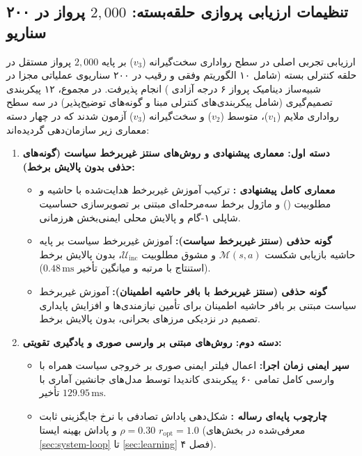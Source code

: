 \documentclass[oneside,openany,phd]{TMU-Thesis}
\begin{document}
\subsection{تنظیمات ارزیابی پروازی حلقه‌بسته: \texorpdfstring{$2{,}000$}{2,000} پرواز در ۲۰۰ سناریو}
\label{subsec:dartsim_setup}

ارزیابی تجربی اصلی در سطح رواداری سخت‌گیرانه ($v_3$) بر پایه $2{,}000$ پرواز مستقل در حلقه کنترلی بسته (شامل ۱۰ الگوریتم وفقی و رقیب در ۲۰۰ سناریوی عملیاتی مجزا در شبیه‌ساز دینامیک پرواز ۶ درجه آزادی ) انجام پذیرفت. در مجموع، ۱۲ پیکربندی تصمیم‌گیری (شامل پیکربندی‌های کنترلی مبنا و گونه‌های توضیح‌پذیر) در سه سطح رواداری ملایم ($v_1$)، متوسط ($v_2$) و سخت‌گیرانه ($v_3$) آزمون شدند که در چهار دسته معماری زیر سازمان‌دهی گردیده‌اند:
\begin{enumerate}
    \item \textbf{دسته اول: معماری پیشنهادی و روش‌های سنتز غیربرخط سیاست (گونه‌های حذفی بدون پالایش برخط):}
    \begin{itemize}
        \item \textbf{معماری کامل پیشنهادی \rsdrlplus:} ترکیب آموزش غیربرخط هدایت‌شده با حاشیه و مطلوبیت (\mursdrl) و ماژول برخط سه‌مرحله‌ای \pgalr مبتنی بر تصویرسازی حساسیت شاپلی ۱-گام و پالایش محلی ایمنی‌بخش هرزمانی.
        \item \textbf{گونه حذفی \mursdrl (سنتز غیربرخط سیاست):} آموزش غیربرخط سیاست بر پایه حاشیه بازیابی شکست $\mathcal{M}(s, a)$ و مشوق مطلوبیت $\mathcal{U}_{\text{inc}}$، بدون پالایش برخط (استنتاج با مرتبه  و میانگین تأخیر $0.48\,\text{ms}$).
        \item \textbf{گونه حذفی \cmrsdrl (سنتز غیربرخط با بافر حاشیه اطمینان):} آموزش غیربرخط سیاست مبتنی بر بافر حاشیه اطمینان برای تأمین نیازمندی‌ها و افزایش پایداری تصمیم در نزدیکی مرزهای بحرانی، بدون پالایش برخط.
    \end{itemize}
    \item \textbf{دسته دوم: روش‌های مبتنی بر وارسی صوری و یادگیری تقویتی:}
    \begin{itemize}
        \item \textbf{سپر ایمنی زمان اجرا:} اعمال فیلتر ایمنی صوری بر خروجی سیاست همراه با وارسی کامل تمامی ۶۰ پیکربندی کاندیدا توسط مدل‌های جانشین آماری \cite{alshiekh2018safe} با تأخیر $129.95\,\text{ms}$.
        \item \textbf{چارچوب پایه‌ای رساله \cite{kavianifar2026rsdrl}:} شکل‌دهی پاداش تصادفی با نرخ جایگزینی ثابت $\rho = 0.30$ و پاداش بهینه ایستا $r_{\text{opt}} = 1.0$ (معرفی‌شده در بخش‌های \ref{sec:system-loop} تا \ref{sec:learning} فصل ۴).

\end{itemize}
\end{enumerate}
\end{document}
